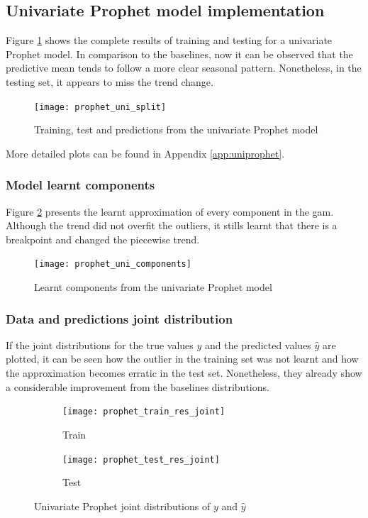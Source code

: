 \subsection{Univariate Prophet model implementation}

Figure \ref{fig:prophet_uni_split} shows the complete results of training and testing for a univariate Prophet model. In comparison to the baselines, now it can be observed that the predictive mean tends to follow a more clear seasonal pattern. Nonetheless, in the testing set, it appears to miss the trend change.

\begin{figure}[H]
	\centering
	\texttt{[image: prophet\_uni\_split]}
	\caption{Training, test and predictions from the univariate Prophet model}
	\label{fig:prophet_uni_split}
\end{figure}

More detailed plots can be found in Appendix \ref{app:uniprophet}.


\subsubsection*{Model learnt components}

Figure \ref{fig:prophet_uni_components} presents the learnt approximation of every component in the \ac{gam}. Although the trend did not overfit the outliers, it stills learnt that there is a breakpoint and changed the piecewise trend.

\begin{figure}[H]
	\centering
	\texttt{[image: prophet\_uni\_components]}
	\caption{Learnt components from the univariate Prophet model}
	\label{fig:prophet_uni_components}
\end{figure}

\subsubsection*{Data and predictions joint distribution}

If the joint distributions for the true values $y$ and the predicted values $\hat{y}$ are plotted, it can be seen how the outlier in the training set was not learnt and how the approximation becomes erratic in the test set. Nonetheless, they already show a considerable improvement from the baselines distributions.

\begin{figure}[hptb]
	\centering
	\begin{subfigure}{.49\textwidth}
		\texttt{[image: prophet\_train\_res\_joint]}
		\caption{Train}
		\label{fig:prophet_train_res_joint}
	\end{subfigure}%
	\hfill
	\begin{subfigure}{.49\textwidth}
		\texttt{[image: prophet\_test\_res\_joint]}
		\caption{Test}
		\label{fig:prophet_test_res_joint}
	\end{subfigure}
	\caption{Univariate Prophet joint distributions of $y$ and $\hat{y}$}
	\label{fig:prophet_res_joint}
\end{figure}


